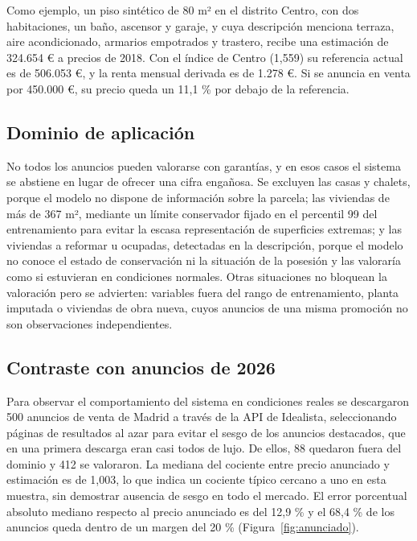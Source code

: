 \documentclass[11pt,a4paper]{article}
\begin{document}
Como ejemplo, un piso sintético de 80 m² en el distrito Centro, con dos habitaciones, un baño, ascensor y garaje, y cuya descripción menciona terraza, aire acondicionado, armarios empotrados y trastero, recibe una estimación de 324.654 € a precios de 2018. Con el índice de Centro (1,559) su referencia actual es de 506.053 €, y la renta mensual derivada es de 1.278 €. Si se anuncia en venta por 450.000 €, su precio queda un 11,1 \% por debajo de la referencia.

\subsection{Dominio de aplicación}

No todos los anuncios pueden valorarse con garantías, y en esos casos el sistema se abstiene en lugar de ofrecer una cifra engañosa. Se excluyen las casas y chalets, porque el modelo no dispone de información sobre la parcela; las viviendas de más de 367 m², mediante un límite conservador fijado en el percentil 99 del entrenamiento para evitar la escasa representación de superficies extremas; y las viviendas a reformar u ocupadas, detectadas en la descripción, porque el modelo no conoce el estado de conservación ni la situación de la posesión y las valoraría como si estuvieran en condiciones normales. Otras situaciones no bloquean la valoración pero se advierten: variables fuera del rango de entrenamiento, planta imputada o viviendas de obra nueva, cuyos anuncios de una misma promoción no son observaciones independientes.

\subsection{Contraste con anuncios de 2026}

Para observar el comportamiento del sistema en condiciones reales se descargaron 500 anuncios de venta de Madrid a través de la API de Idealista, seleccionando páginas de resultados al azar para evitar el sesgo de los anuncios destacados, que en una primera descarga eran casi todos de lujo. De ellos, 88 quedaron fuera del dominio y 412 se valoraron. La mediana del cociente entre precio anunciado y estimación es de 1,003, lo que indica un cociente típico cercano a uno en esta muestra, sin demostrar ausencia de sesgo en todo el mercado. El error porcentual absoluto mediano respecto al precio anunciado es del 12,9 \% y el 68,4 \% de los anuncios queda dentro de un margen del 20 \% (Figura~\ref{fig:anunciado}).
\end{document}
